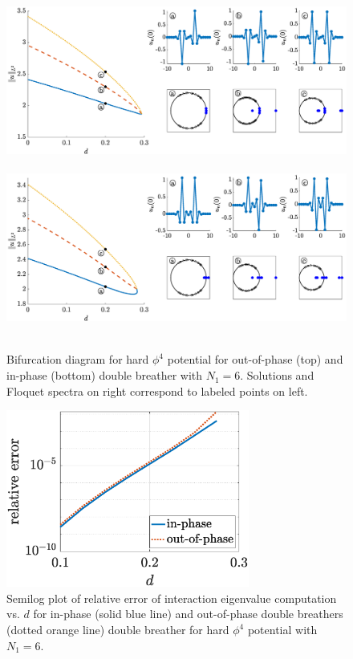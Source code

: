 \documentclass[12pt,reqno]{amsart}
\theoremstyle{definition}
\begin{document}
\begin{figure}
	\hbox{
	\hspace{-2cm}
	\includegraphics[width=20cm]{bifdiagphi4oppositeN6.eps}
	}
	\hbox{
	\hspace{-2cm}
	\includegraphics[width=20cm]{bifdiagphi4inphaseN6.eps}
	}
	\caption{Bifurcation diagram for hard $\phi^4$ potential for out-of-phase (top) and in-phase (bottom) double breather with $N_1 = 6$. Solutions and Floquet spectra on right correspond to labeled points on left.}
	\label{fig:bifdiagphi4}
\end{figure}

\begin{figure}
	\begin{center}
	\includegraphics[width=8cm]{doubleeigerrorphi4.eps} 
	\end{center}
	\caption{Semilog plot of relative error of interaction eigenvalue computation vs. $d$ for in-phase (solid blue line) and out-of-phase double breathers (dotted orange line) double breather for hard $\phi^4$ potential with $N_1 = 6$.}
	\label{fig:phi4eigerror}
\end{figure}
\end{document}
